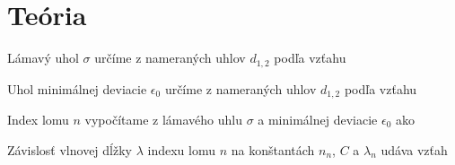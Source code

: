 \section{Teória}
Lámavý uhol $\sigma$ určíme z nameraných uhlov $d_{1,2}$ podľa vzťahu

Uhol minimálnej deviacie $\epsilon_0$ určíme z nameraných uhlov $d_{1,2}$ podľa vzťahu

Index lomu $n$ vypočítame z lámavého uhlu $\sigma$ a minimálnej deviacie $\epsilon_0$ ako

Závislosť vlnovej dĺžky $\lambda$ indexu lomu $n$ na konštantách $n_n$, $C$ a $\lambda_n$ udáva vzťah



